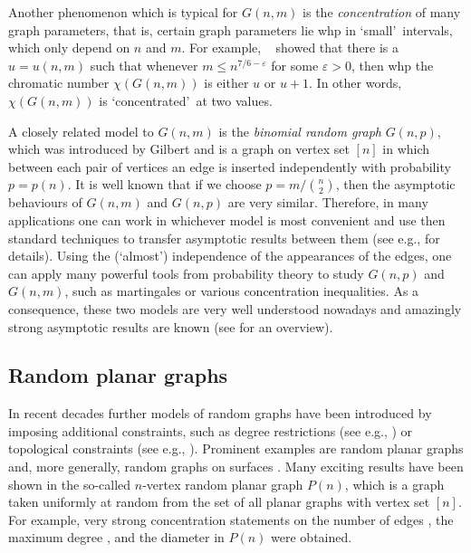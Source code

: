 Another phenomenon which is typical for $G(n,m)$ is the {\em concentration} of many graph parameters, that is, certain graph parameters lie whp in \lq small\rq\ intervals, which only depend on $n$ and $m$. For example, \Luczak\ \cite{Luczak1991} showed that there is a $u=u(n,m)$ such that whenever $m\leq n^{7/6-\varepsilon}$ for some $\varepsilon>0$, then whp the chromatic number $\chi\left(G(n,m)\right)$ is either $u$ or $u+1$. In other words, $\chi\left(G(n,m)\right)$ is \lq concentrated\rq\ at two values.

A closely related model to $G(n,m)$ is the {\em binomial random graph} $G(n,p)$, which was introduced by Gilbert \cite{Gilbert1959} and is a graph on vertex set $[n]$ in which between each pair of vertices an edge is inserted independently with probability $p=p(n)$. It is well known that if we choose $p=m/\binom{n}{2}$, then the asymptotic behaviours of $G(n,m)$ and $G(n,p)$ are very similar. Therefore, in many applications one can work in whichever model is most convenient and use then standard techniques to transfer asymptotic results between them (see e.g., \cite[Section 1.1]{FriezeKaronski2016} for details). Using the (\lq almost\rq ) independence of the appearances of the edges, one can apply many powerful tools from probability theory to study $G(n,p)$ and $G(n,m)$, such as martingales or various concentration inequalities. As a consequence, these two models are very well understood nowadays and amazingly strong asymptotic results are known (see \cite{Bollobas2001,FriezeKaronski2016,JansonLuczakRucinski2000} for an overview).

\subsection{Random planar graphs}\label{sub:random_planar}
In recent decades further models of random graphs have been introduced by imposing additional constraints, such as degree restrictions (see e.g., \cite{Bollobas1980,MolloyReed1995,RobinsonWormald1992,Wormald1999}) or topological constraints (see e.g., \cite{GerkeMcDiarmidStegerWeissl2005,KangLuczak2012,KangMosshammerSpruessel2020}). Prominent examples are random planar graphs \cite{ChapuyFusyGimenezNoy2015,DrmotaGimenezNoyPanagiotouSteger2014,Fusy2009,GimenezNoy2009,KangLuczak2012,McDiarmidReed2008,McDiarmidStegerWelsh2005,PanagiotouSteger2010} and, more generally, random graphs on surfaces \cite{ChapuyFusyGimenezMoharNoy2011,DowdenKangSpruessel2018,KangMosshammerSpruessel2020,McDiarmid2008}. Many exciting results have been shown in the so-called $n$-vertex random planar graph $P(n)$, which is a graph taken uniformly at random from the set of all planar graphs with vertex set $[n]$. For example, very strong concentration statements on the number of edges \cite{GimenezNoy2009}, the maximum degree \cite{DrmotaGimenezNoyPanagiotouSteger2014,McDiarmidReed2008}, and the diameter \cite{ChapuyFusyGimenezNoy2015} in $P(n)$ were obtained. 

